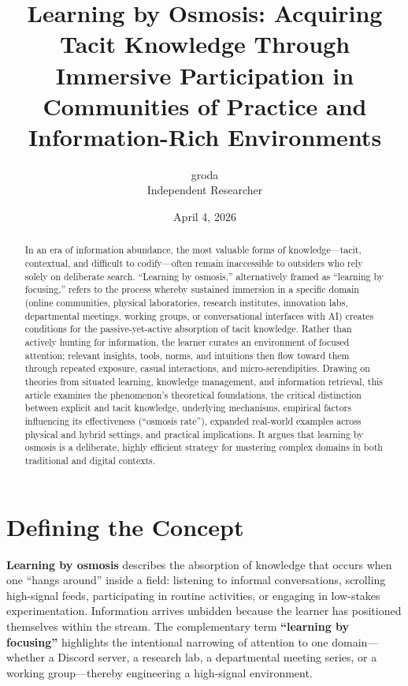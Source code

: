 \documentclass[11pt,a4paper]{article}
\title{Learning by Osmosis: Acquiring Tacit Knowledge Through Immersive Participation in Communities of Practice and Information-Rich Environments}
\author{groda \\ Independent Researcher}
\date{April 4, 2026}
\begin{document}
\maketitle

\begin{abstract}
In an era of information abundance, the most valuable forms of knowledge---tacit, contextual, and difficult to codify---often remain inaccessible to outsiders who rely solely on deliberate search. ``Learning by osmosis,'' alternatively framed as ``learning by focusing,'' refers to the process whereby sustained immersion in a specific domain (online communities, physical laboratories, research institutes, innovation labs, departmental meetings, working groups, or conversational interfaces with AI) creates conditions for the passive-yet-active absorption of tacit knowledge. Rather than actively hunting for information, the learner curates an environment of focused attention; relevant insights, tools, norms, and intuitions then flow toward them through repeated exposure, casual interactions, and micro-serendipities. Drawing on theories from situated learning, knowledge management, and information retrieval, this article examines the phenomenon's theoretical foundations, the critical distinction between explicit and tacit knowledge, underlying mechanisms, empirical factors influencing its effectiveness (``osmosis rate''), expanded real-world examples across physical and hybrid settings, and practical implications. It argues that learning by osmosis is a deliberate, highly efficient strategy for mastering complex domains in both traditional and digital contexts.
\end{abstract}

\section{Defining the Concept}
\textbf{Learning by osmosis} describes the absorption of knowledge that occurs when one ``hangs around'' inside a field: listening to informal conversations, scrolling high-signal feeds, participating in routine activities, or engaging in low-stakes experimentation. Information arrives unbidden because the learner has positioned themselves within the stream. The complementary term \textbf{``learning by focusing''} highlights the intentional narrowing of attention to one domain---whether a Discord server, a research lab, a departmental meeting series, or a working group---thereby engineering a high-signal environment.
\end{document}
